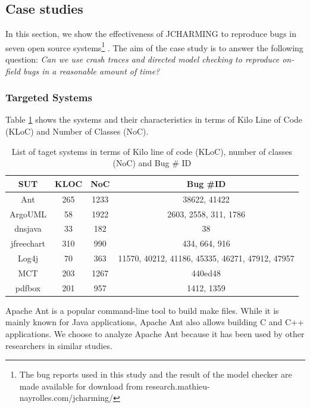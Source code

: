 \subsection{Case studies}

In this section, we show the effectiveness of JCHARMING to
reproduce bugs in seven open source systems\footnote{The bug reports used in this study and the result of the model checker are
made available for download from research.mathieu-
nayrolles.com/jcharming/} . The aim of the
case study is to answer the following question: {\it Can we use
crash traces and directed model checking to reproduce on-
field bugs in a reasonable amount of time?}

\subsubsection{Targeted Systems}

Table \ref{tab:jacharming-systems} shows the systems and their characteristics in terms of
Kilo Line of Code (KLoC) and Number of Classes (NoC).

\begin{table}[h!]
\centering
\begin{tabular}{c|c|c|c}
SUT        & KLOC & NoC  & Bug \#ID                                        \\ \hline \hline
Ant        & 265  & 1233 & 38622, 41422                                    \\
ArgoUML    & 58   & 1922 & 2603, 2558, 311, 1786                           \\
dnsjava    & 33   & 182  & 38                                              \\
jfreechart & 310  & 990  & 434, 664, 916                                   \\
Log4j      & 70   & 363  & 11570, 40212, 41186, 45335, 46271, 47912, 47957 \\
MCT        & 203  & 1267 & 440ed48                                         \\
pdfbox     & 201  & 957  & 1412, 1359 \\ \hline \hline
\end{tabular}
\caption{List of taget systems in terms of Kilo line of code (KLoC), number of classes (NoC) and Bug \# ID}
\label{tab:jacharming-systems}
\end{table}

Apache Ant \cite{ApacheSoftwareFoundation} is a popular command-line tool to build
make files. While it is mainly known for Java applications,
Apache Ant also allows building C and C++ applications. We
choose to analyze Apache Ant because it has been used by
other researchers in similar studies.

